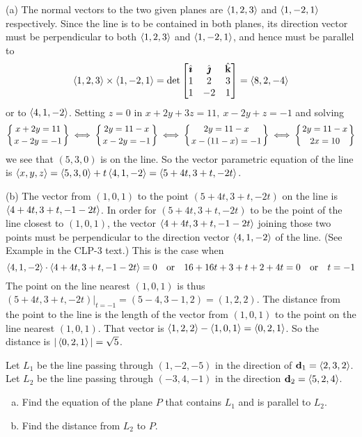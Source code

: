 \begin{solution} (a)
The normal vectors to the two given planes are 
$\left< 1,2,3\right> $ and $\left< 1,-2,1\right> $ respectively. 
Since the line is to be contained in both planes, its direction vector 
must be perpendicular to both $\left< 1,2,3\right> $ and $\left< 1,-2,1\right> $, 
and hence must be parallel to 
\begin{equation*}
\left< 1,2,3\right> \times\left< 1,-2,1\right> 
=\det\left[\begin{matrix}
           \hat{\pmb{\imath}} & \hat{\pmb{\jmath}} & \hat{\mathbf{k}} \\
           1  &  2  &  3 \\
           1  &  -2  & 1
  \end{matrix}\right]
=\left< 8, 2,-4\right>
\end{equation*} 
or to $\left< 4,1,-2\right> $. Setting $z=0$ in $x+2y+3z=11,\ x-2y+z=-1$ and
solving 
\begin{align*}
\left\{\Atop{x+2y=11}{x-2y=-1} \right\}
\iff \left\{\Atop{2y=11-x}{x-2y=-1} \right\}
\iff \left\{\Atop{2y=11-x}{x-(11-x)=-1} \right\}
\iff \left\{\Atop{2y=11-x}{2x=10} \right\}
\end{align*}
we see that $(5,3,0)$ is on the line. So
the vector parametric equation of the line is 
$\left< x,y,z\right>=\left< 5,3,0\right>+t\left< 4,1,-2\right> =\left< 5+4t,3+t,-2t\right>$.


\noindent (b) 
The vector from $(1,0,1)$ to the point $(5+4t,3+t,-2t)$ on the line
is $\left< 4+4t,3+t,-1-2t\right>$. In order for $(5+4t,3+t,-2t)$ to be the point 
of the line closest to $(1,0,1)$, the vector $\left< 4+4t,3+t,-1-2t\right>$ 
joining those two points must be perpendicular to the direction vector 
$\left< 4,1,-2\right> $ of the line. (See Example   in the CLP-3 text.)
This is the case when
\begin{equation*}
\left< 4,1,-2\right> \cdot \left< 4+4t,3+t,-1-2t\right> =0\quad\text{or}\quad
16+16t+3+t+2+4t=0\quad\text{or}\quad t=-1
\end{equation*}
The point on the line nearest $(1,0,1)$ is thus 
$(5+4t,3+t,-2t)\Big|_{t=-1}=(5-4,3-1,2)=(1,2,2)$. The distance
from the point to the line is the length of the vector from
$(1,0,1)$ to the point on the line nearest $(1,0,1)$. That vector is 
$\left< 1,2,2\right> -\left< 1,0,1\right> =\left< 0,2,1\right>$. So the distance is 
$|\left< 0,2,1\right>|=\sqrt{5}$.
\end{solution}

\begin{question}
Let $L_1$ be the line passing through $(1,-2,-5)$ in the direction of 
$\mathbf{d}_1=\left< 2,3,2\right>$. 
Let $L_2$ be the line passing through $(-3,4,-1)$ in the direction 
$\mathbf{d}_2=\left< 5,2,4\right>$.
\begin{enumerate}[(a)]
\item
Find the equation of the plane $P$ that contains $L_1$
and is parallel to $L_2$.
\item
Find the distance from $L_2$ to $P$.
\end{enumerate}
\end{question}

